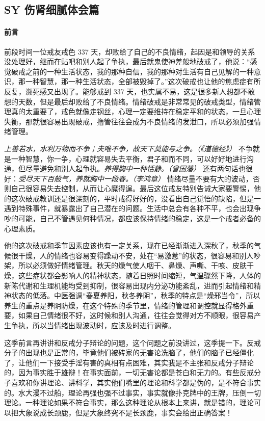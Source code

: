 \subsection{SY 伤肾细腻体会篇}

\paragraph*{前言}

前段时间一位戒友戒色 337 天，却败给了自己的不良情绪，起因是和领导的关系没处理好，继而在贴吧和别人起了争执，最后就鬼使神差般地破戒了，他说：“感觉破戒之前的一种生活状态，我的那种自信，我的那种对生活有自己见解的一种意识，那一种智慧，那一种生活状态，全部被毁掉了。”这次破戒也让他的焦虑症有所反复，濒死感又出现了。能够戒到 337 天，也实属不易，这是很多新人想都不敢想的天数，但是最后却败给了不良情绪。情绪破戒是非常常见的破戒类型，情绪管理真的太重要了，戒色就像走钢丝，心理一定要维持在稳定平和的状态，一旦心理失衡，那就很容易出现破戒，撸管往往会成为不良情绪的发泄口，所以必须加强情绪管理。

\textit{上善若水，水利万物而不争；夫唯不争，故天下莫能与之争。（《道德经》）} 不争就是一种智慧，你一争，心理就容易失去平衡，君子和而不同，可以好好地进行沟通，但尽量避免和别人起争执。\textit{养得胸中一种恬静。（曾国藩）} 还有两句话也很好：\textit{受尽天下百般气，养就胸中一段春。（李鸿章）} 情绪尽量不要有大的波动，否则自己很容易失去控制，从而让心魔得逞。最后这位戒友特别告诫大家要警惕，他的这次破戒教训还是很深刻的，平时戒得好好的，没看出自己觉悟的缺陷，但是一遇到特殊事件，就暴露出了自己潜在的问题。生活中总会有各种不平，也会出现争吵的可能，自己不管遇见何种情况，都应该保持情绪的稳定，这是一个戒者必备的心理素质。

他的这次破戒和季节因素应该也有一定关系，现在已经渐渐进入深秋了，秋季的气候很干燥，人的情绪也容易变得躁动不安，处在“易激惹”的状态，很容易和别人吵架，所以必须做好情绪管理。秋天的燥气使人咽干、鼻燥、声嘶、干咳、皮肤干燥，这些症状都会影响人的精神状态，随着日照时间缩短，气温骤然下降，人体的新陈代谢和生理机能均受到抑制，很容易出现内分泌功能紊乱，进而引起情绪和精神状态的低落。中医强调“春夏养阳，秋冬养阴”，秋季的特点是“燥邪当令”，所以养生的重点是养阴防燥，在这个特殊的季节里，情绪的管理和调控就显得格外重要，如果自己情绪很不好，这时候和别人沟通，往往会觉得对方不顺眼，很容易产生争执，所以当情绪出现波动时，应该及时进行调整。

这季前言再讲讲和反戒分子辩论的问题，这个问题之前没讲过，这季提一下。反戒分子的出现也是正常的，毕竟他们被砖家的无害论洗脑了，他们的脑子已经僵化了，让他们一下接受手淫有害的真相有点困难，其实我是不主张和反戒分子辩论的，因为事实胜于雄辩！在事实面前，一切无害论都是苍白和无力的。有些反戒分子喜欢和你讲理论、讲科学，其实他们嘴里的理论和科学都是伪的，是不符合事实的。水大漫不过船，理论再强也强不过事实，事实就像扑克牌中的王牌，压倒一切理论。一种理论如果不符合事实，那么这种理论从根本上来讲，就是错的，理论可以把大象说成长颈鹿，但是大象终究不是长颈鹿，事实会给出正确答案！

